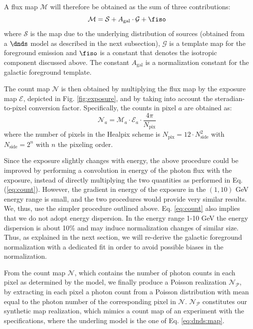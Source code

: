 \noindent
%
A flux map $\mathcal{M}$ will therefore be obtained as the sum of three contributions:
\begin{equation}
    \mathcal{M} = \mathcal{S} + A_\textrm{gal} \cdot \mathcal{G} + \fiso
    \label{eq:dnds:map}
\end{equation}
where $\mathcal{S}$ is the map due to the underlying distribution of sources (obtained from a $\dnds$ model as described in the next subsection), $\mathcal{G}$ is a template map for the foreground emission and $\fiso$ is a constant that denotes the isotropic component discussed above. The constant $A_\textrm{gal}$ is a normalization constant for the galactic foreground template. 

The count map $\mathcal{N}$ is then obtained by multiplying the flux map by the \fermi exposure map $\mathcal{E}$, depicted in Fig. \ref{fig:exposure}, and by taking into account the steradian-to-pixel conversion factor. Specifically, the counts in pixel $a$ are obtained as:
\begin{equation}
    \mathcal{N}_a = \mathcal{M}_a \cdot \mathcal{E}_a \cdot \frac{4\pi}{N_\textrm{pix}}
    \label{eq:count}
\end{equation}
%
where the number of pixels in the Healpix scheme is $N_\textrm{pix} = 12\cdot N^2_\textrm{side}$ with $N_\textrm{side} = 2^{n}$ with $n$ the pixeling order.

Since the exposure slightly changes with energy, the above procedure could be improved by performing a convolution in energy of the photon flux with the exposure, instead of directly multiplying the two quantities as performed in Eq. (\ref{eq:count}). However, the gradient in energy of the exposure in the $(1,10)$ GeV energy range is small, and the two procedures would provide very similar results.  We, thus, use the simpler procedure outlined above. 
Eq. \ref{eq:count} also implies that we do not adopt energy dispersion. In the energy range 1-10 GeV the energy dispersion is about 10\% \cite{Fermi-LAT:2013jgq} and may induce normalization changes of similar size.
Thus, as explained in the next section, we will re-derive the galactic foreground normalization with a dedicated fit in order to avoid possible biases in the normalization.

From the count map $\mathcal{N}$, which contains the number of photon counts in each pixel as determined by the model, we finally produce a Poisson realization $\mathcal{N}_\mathcal{P}$, by extracting in each pixel a photon count from a Poisson distribution with mean equal to the photon number of the corresponding pixel in $\mathcal{N}$. $\mathcal{N}_\mathcal{P}$ constitutes our synthetic map realization, which mimics a count map of an experiment with the \fermi specifications, where the underling model is the one of Eq. \ref{eq:dnds:map}.

